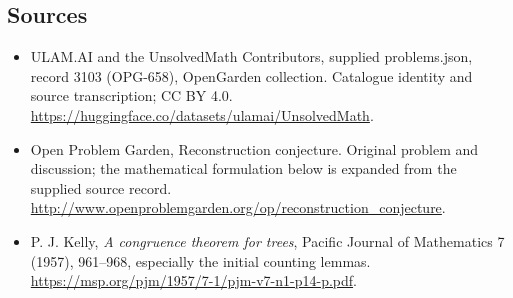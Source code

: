 \documentclass[11pt,a4paper]{article}
\begin{document}
\subsection{Sources}
\begin{itemize}
\item[S1] ULAM.AI and the UnsolvedMath Contributors, supplied problems.json, record 3103 (OPG-658), OpenGarden collection. Catalogue identity and source transcription; CC BY 4.0.
\url{https://huggingface.co/datasets/ulamai/UnsolvedMath}.
\item[S2] Open Problem Garden, Reconstruction conjecture. Original problem and discussion; the mathematical formulation below is expanded from the supplied source record.
\url{http://www.openproblemgarden.org/op/reconstruction_conjecture}.
\item[A1] P. J. Kelly, \emph{A congruence theorem for trees}, Pacific Journal of Mathematics 7 (1957), 961--968, especially the initial counting lemmas. \url{https://msp.org/pjm/1957/7-1/pjm-v7-n1-p14-p.pdf}.
\end{itemize}
\end{document}
